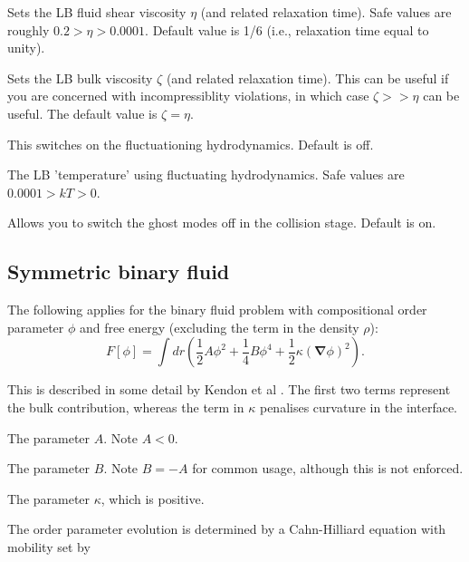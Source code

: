 
Sets the LB fluid shear viscosity $\eta$ (and related relaxation time).
Safe values are roughly $0.2 > \eta > 0.0001 $. Default value is 1/6
(i.e., relaxation time equal to unity).


Sets the LB bulk viscosity $\zeta$ (and related relaxation time).
This can be useful if you are concerned with incompressiblity
violations, in which case $\zeta >> \eta$ can be useful. The
default value is $\zeta = \eta$.


This switches on the fluctuationing hydrodynamics. Default is off.


The LB 'temperature' using fluctuating hydrodynamics. Safe values
are $0.0001 > kT > 0$. 


Allows you to switch the ghost modes off in the collision stage.
Default is on.


\subsection{Symmetric binary fluid}


The following applies for the binary fluid problem with
compositional order parameter $\phi$ and free energy
(excluding the term in the density $\rho$):
\begin{equation}
 F[\phi] = 
\int dr \left(
{\textstyle \frac{1}{2}}A\phi^2
+ {\textstyle \frac{1}{4}}B\phi^4
+ {\textstyle \frac{1}{2}}\kappa (\mathbf{\nabla}\phi)^2 \right).
\end{equation}

This is described in some detail
by Kendon et al \cite{viv}. The first two terms represent the bulk
contribution, whereas the term in $\kappa$ penalises curvature in
the interface.

 The parameter $A$. Note $A < 0$.

 The parameter $B$. Note $B = -A$ for common usage,
although this is not enforced.

 The parameter $\kappa$, which is positive.

The order parameter evolution is determined by a Cahn-Hilliard equation
with mobility set by

